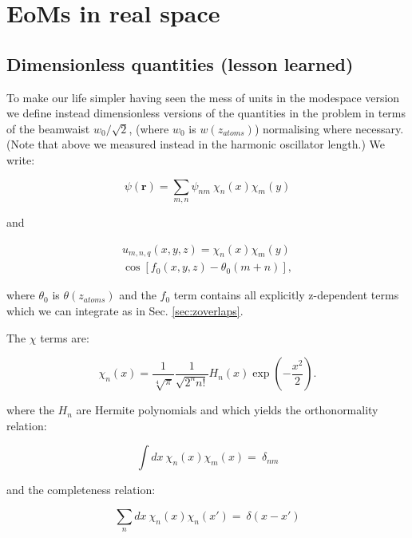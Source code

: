 \documentclass[a4paper,twocolumn,nobalancelastpage]{revtex4-1}
\begin{document}

\pagebreak
\section{EoMs in real space}

\subsection{Dimensionless quantities (lesson learned)}

To make our life simpler having seen the mess of units in the modespace version we define instead dimensionless versions of the quantities in the problem in terms of the beamwaist $w_0/\sqrt{2}$, (where $w_0$ is $w(z_{atoms})$) normalising where necessary. (Note that above we measured instead in the harmonic oscillator length.) We write:

\begin{equation}
\label{eq:fullatomicfield}
\psi(\textbf{r})= \sum_{m,n} \psi_{nm} \  \chi_{n}(x) \chi_m (y)
\end{equation}

and

\begin{multline}
  u_{m,n,q}(x,y,z) = 
  \chi_n (x) \chi_m(y)
  \\
  \cos \left[ f_0 (x,y,z) - \theta_0 (m+n) \right],
\end{multline}

where $\theta_0$ is $\theta(z_{atoms})$ and the $f_0$ term contains all explicitly z-dependent terms which we can integrate as in Sec. \ref{sec:zoverlaps}.

The $\chi$ terms are:

\begin{displaymath}
  \chi_n(x) = \frac{1}{\sqrt[4]{\pi}}
  \frac{1}{\sqrt{2^n n!}} H_n(x) \exp\left(-\frac{x^2}{2} \right).
\end{displaymath}

where the $H_n$ are Hermite polynomials and which yields the orthonormality relation:

\begin{equation}
\label{eq:HGorthonormality}
\int dx \ \chi_n (x) \chi_m (x) = \ \delta_{nm}
\end{equation}

and the completeness relation:

\begin{equation}
\label{eq:HGcompleteness}
\sum_n dx \ \chi_n (x) \chi_n (x') = \ \delta(x-x')
\end{equation}
\end{document}
